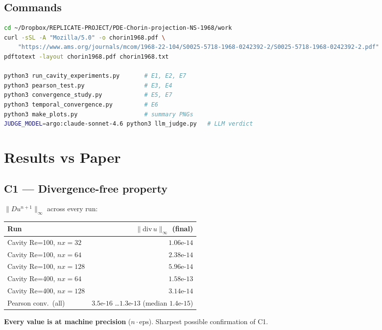 \documentclass[11pt]{article}
\begin{document}
\subsection{Commands}

\begin{lstlisting}[language=bash]
cd ~/Dropbox/REPLICATE-PROJECT/PDE-Chorin-projection-NS-1968/work
curl -sSL -A "Mozilla/5.0" -o chorin1968.pdf \
    "https://www.ams.org/journals/mcom/1968-22-104/S0025-5718-1968-0242392-2/S0025-5718-1968-0242392-2.pdf"
pdftotext -layout chorin1968.pdf chorin1968.txt

python3 run_cavity_experiments.py       # E1, E2, E7
python3 pearson_test.py                 # E3, E4
python3 convergence_study.py            # E5, E7
python3 temporal_convergence.py         # E6
python3 make_plots.py                   # summary PNGs
JUDGE_MODEL=argo:claude-sonnet-4.6 python3 llm_judge.py   # LLM verdict
\end{lstlisting}

\section{Results vs Paper}

\subsection{C1 --- Divergence-free property}

$\|D u^{n+1}\|_\infty$ across every run:

\begin{center}
\begin{tabular}{@{}lr@{}}
\toprule
Run & $\|\mathrm{div}\,u\|_\infty$ (final) \\
\midrule
Cavity Re=100, $nx=32$   & $1.06\text{e-}14$ \\
Cavity Re=100, $nx=64$   & $2.38\text{e-}14$ \\
Cavity Re=100, $nx=128$  & $5.96\text{e-}14$ \\
Cavity Re=400, $nx=64$   & $1.58\text{e-}13$ \\
Cavity Re=400, $nx=128$  & $3.14\text{e-}14$ \\
Pearson conv.\ (all)     & $3.5\text{e-}16$ \ldots $1.3\text{e-}13$ (median $1.4\text{e-}15$) \\
\bottomrule
\end{tabular}
\end{center}

\textbf{Every value is at machine precision} ($n\cdot\mathrm{eps}$). Sharpest possible confirmation of C1.
\end{document}
